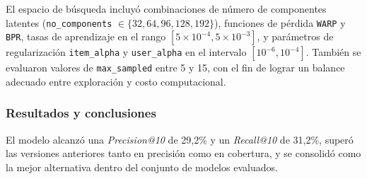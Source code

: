 El espacio de búsqueda incluyó combinaciones de número de componentes latentes (\texttt{no\_components} $\in \{32, 64, 96, 128, 192\}$), funciones de pérdida \texttt{WARP} y \texttt{BPR}, tasas de aprendizaje en el rango $[5 \times 10^{-4}, 5 \times 10^{-3}]$, y parámetros de regularización \texttt{item\_alpha} y \texttt{user\_alpha} en el intervalo $[10^{-6}, 10^{-4}]$. También se evaluaron valores de \texttt{max\_sampled} entre 5 y 15, con el fin de lograr un balance adecuado entre exploración y costo computacional.



\subsubsection{Resultados y conclusiones}

El modelo alcanzó una \textit{Precision@10} de 29{,}2\% y un \textit{Recall@10} de 31{,}2\%, superó las versiones anteriores tanto en precisión como en cobertura, y se consolidó como la mejor alternativa dentro del conjunto de modelos evaluados.

